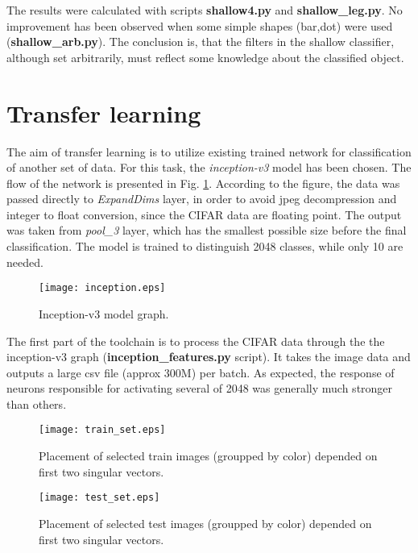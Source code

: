 \documentclass{article}
\begin{document}
The results were calculated with scripts {\bf shallow4.py} and {\bf shallow\_leg.py}.
No improvement has been observed when some simple shapes (bar,dot) were used
({\bf shallow\_arb.py}). The conclusion is, that the filters in the shallow
classifier, although set arbitrarily, must reflect some knowledge about
the classified object.




\section{Transfer learning}

The aim of transfer learning is to utilize existing trained network for classification
of another set of data. For this task, the {\em inception-v3} model has been chosen.
The flow of the network is presented in Fig. \ref{incept}. According to the
figure, the data was passed directly to {\em ExpandDims} layer, in order to avoid
jpeg decompression and integer to float conversion, since the CIFAR data are
floating point. The output was taken from {\em pool\_3} layer,
which has the smallest possible size before the final classification.
The model is trained to distinguish 2048 classes, while only 10 are needed.

\begin{figure}[!hbt]
  \centering
  \texttt{[image: inception.eps]}
  \caption{\label{incept}Inception-v3 model graph.}
\end{figure}

The first part of the toolchain is to process the CIFAR data through the
the inception-v3 graph ({\bf inception\_features.py} script).
It takes the image data and outputs a large csv file (approx 300M)
per batch. As expected, the response of neurons responsible for activating
several of 2048 was generally much stronger than others.

\begin{figure}[!hbt]
  \centering
  \texttt{[image: train\_set.eps]}
  \caption{\label{svd1}Placement of selected train images (groupped by color) depended on first two singular vectors.}
\end{figure}

\begin{figure}[!hbt]
  \centering
  \texttt{[image: test\_set.eps]}
  \caption{\label{svd2}Placement of selected test images (groupped by color) depended on first two singular vectors.}
\end{figure}
\end{document}
